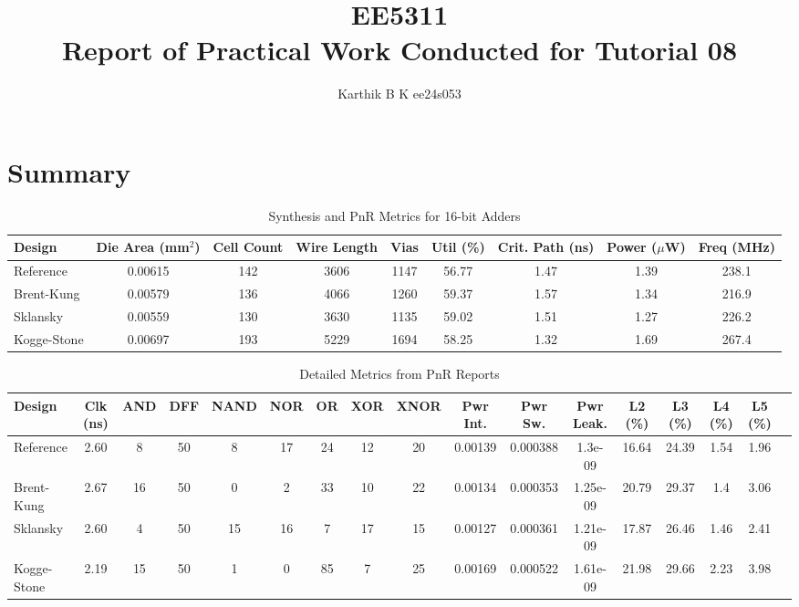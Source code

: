 \documentclass[12pt,a4paper]{article}
\begin{document}
\title{EE5311 \\ Report of Practical Work Conducted for Tutorial 08}
\author{Karthik B K ee24s053}
\maketitle

\section{Summary}

\begin{table}[ht]
\centering
\caption{Synthesis and PnR Metrics for 16-bit Adders}
\begin{tabular}{lcccccccc}
\hline
Design & Die Area (mm$^2$) & Cell Count & Wire Length & Vias & Util (\%) & Crit. Path (ns) & Power ($\mu$W) & Freq (MHz) \\
\hline
Reference   & 0.00615 & 142 & 3606 & 1147 & 56.77 & 1.47 & 1.39 & 238.1 \\
Brent-Kung  & 0.00579 & 136 & 4066 & 1260 & 59.37 & 1.57 & 1.34 & 216.9 \\
Sklansky    & 0.00559 & 130 & 3630 & 1135 & 59.02 & 1.51 & 1.27 & 226.2 \\
Kogge-Stone & 0.00697 & 193 & 5229 & 1694 & 58.25 & 1.32 & 1.69 & 267.4 \\
\hline
\end{tabular}
\label{tab:adders-pnr}
\end{table}

\begin{table}[ht]
\centering
\caption{Detailed Metrics from PnR Reports}
\begin{tabular}{lcccccccccccccccc}
\hline
Design & Clk (ns) & AND & DFF & NAND & NOR & OR & XOR & XNOR & Pwr Int. & Pwr Sw. & Pwr Leak. & L2 (\%) & L3 (\%) & L4 (\%) & L5 (\%) \\
\hline
Reference   & 2.60 & 8  & 50 & 8  & 17 & 24 & 12 & 20 & 0.00139 & 0.000388 & 1.3e-09 & 16.64 & 24.39 & 1.54 & 1.96 \\
Brent-Kung  & 2.67 & 16 & 50 & 0  & 2  & 33 & 10 & 22 & 0.00134 & 0.000353 & 1.25e-09 & 20.79 & 29.37 & 1.4  & 3.06 \\
Sklansky    & 2.60 & 4  & 50 & 15 & 16 & 7  & 17 & 15 & 0.00127 & 0.000361 & 1.21e-09 & 17.87 & 26.46 & 1.46 & 2.41 \\
Kogge-Stone & 2.19 & 15 & 50 & 1  & 0  & 85 & 7  & 25 & 0.00169 & 0.000522 & 1.61e-09 & 21.98 & 29.66 & 2.23 & 3.98 \\
\hline
\end{tabular}
\label{tab:adders-detailed}
\end{table}
\end{document}
